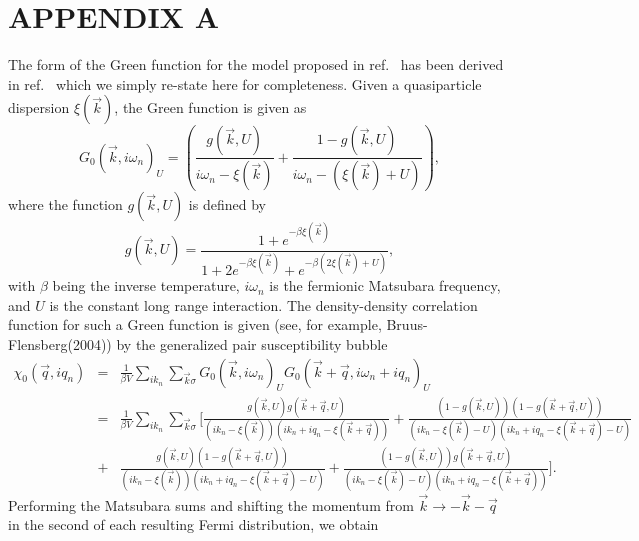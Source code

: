\documentclass[prl,aps,twocolumn,groupaddress]{revtex4-1}
\begin{document}
\section{APPENDIX A}
The form of the Green function for the model proposed in ref.~\cite{hk1992} has been derived in ref.~\cite{hk1996} which we simply re-state here for completeness. Given a quasiparticle dispersion $\xi(\vec k)$, the Green function is given as
\begin{equation}
G_0(\vec k,i\omega_n)_U = \left(\frac{g(\vec k, U)}{i \omega_n - \xi(\vec k)} +  \frac{1- g(\vec k, U)}{i\omega_n - \left(\xi(\vec k) + U\right)}\right),
\end{equation}
where the function $g(\vec k, U)$ is defined by
\begin{equation}
g(\vec k, U) = \frac{1+ e^{-\beta \xi(\vec k)}}{1+ 2 e^{-\beta \xi(\vec k)} + e^{-\beta\left(2\xi(\vec k) + U\right)}},
\end{equation}
with $\beta$ being the inverse temperature, $i\omega_n$ is the fermionic Matsubara frequency, and $U$ is the constant long range interaction. The density-density correlation function for such a Green function is given (see, for example, Bruus-Flensberg(2004)) by the generalized pair susceptibility bubble 
\begin{eqnarray}
\chi_0(\vec q, i q_n) &=& \frac{1}{\beta V} \sum_{i k_n}\sum_{\vec k \sigma} G_0(\vec k,i\omega_n)_U G_0(\vec k + \vec q,i\omega_n +  iq_n)_U \\ \nonumber
&=& \frac{1}{\beta V} \sum_{i k_n}\sum_{\vec k \sigma} \Biggl[ \frac{g(\vec k, U) g(\vec k + \vec q, U)}{\left(i k_n - \xi(\vec k)\right)\left( i k_n + i q_n - \xi(\vec k+ \vec q ) \right)} + \frac{\left(1-g(\vec k, U)\right)\left(1- g(\vec k + \vec q, U)\right)}{\left(i k_n - \xi(\vec k) -U\right)\left( i k_n + i q_n - \xi(\vec k+ \vec q) - U \right)} \\ 
&+& \frac{g(\vec k, U) \left( 1- g(\vec k + \vec q, U)\right)}{\left(i k_n - \xi(\vec k)\right)\left( i k_n + i q_n - \xi(\vec k+ \vec q )  - U\right)} + \frac{\left(1- g(\vec k, U)\right) g(\vec k + \vec q, U)}{\left(i k_n - \xi(\vec k) - U\right)\left( i k_n + i q_n - \xi(\vec k+ \vec q ) \right)} \Biggr].
\end{eqnarray}
Performing the Matsubara sums and shifting the momentum from $\vec k \rightarrow -\vec k - \vec q$ in the second of each resulting Fermi distribution, we obtain
\end{document}
